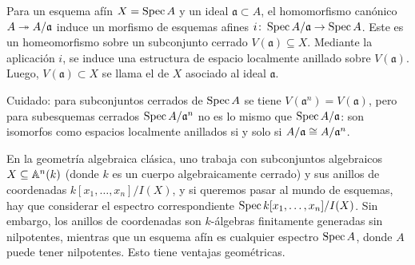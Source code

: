 \documentclass{article}
\numberwithin{equation}{section}
\theoremstyle{definition}
\begin{document}
\begin{ejemplo}
  \label{ejemplo:subesquemas-cerrados}
  Para un esquema afín $X = \Spec A$ y un ideal $\mathfrak{a} \subset A$,
  el homomorfismo canónico $A \epi A/\mathfrak{a}$ induce un morfismo
  de esquemas afines $i\colon \Spec A/\mathfrak{a} \to \Spec A$. Este es
  un homeomorfismo sobre un subconjunto cerrado $V (\mathfrak{a}) \subseteq
  X$. Mediante la aplicación $i$, se induce una estructura de espacio localmente
  anillado sobre $V (\mathfrak{a})$. Luego, $V (\mathfrak{a}) \subset X$ se
  llama el  de $X$ asociado al ideal $\mathfrak{a}$.
\end{ejemplo}

Cuidado: para subconjuntos cerrados de $\Spec A$ se tiene
$V (\mathfrak{a}^n) = V (\mathfrak{a})$, pero para subesquemas cerrados
$\Spec A/\mathfrak{a}^n$ no es lo mismo que $\Spec A/\mathfrak{a}$:
son isomorfos como espacios localmente anillados si y solo si
$A/\mathfrak{a} \isom A/\mathfrak{a}^n$.

\vspace{1em}

En la geometría algebraica clásica, uno trabaja con subconjuntos algebraicos
$X \subseteq \AA^n (k)$ (donde $k$ es un cuerpo algebraicamente cerrado)
y sus anillos de coordenadas $k [x_1,\ldots,x_n] / I (X)$, y si queremos pasar
al mundo de esquemas, hay que considerar el espectro correspondiente
$\Spec k [x_1,\ldots,x_n] / I (X)$. Sin embargo, los anillos de coordenadas
son $k$-álgebras finitamente generadas sin nilpotentes, mientras que un esquema
afín es cualquier espectro $\Spec A$, donde $A$ puede tener nilpotentes. Esto
tiene ventajas geométricas.
\end{document}
